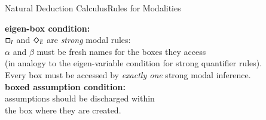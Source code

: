 \begin{frame}[shrink]{Natural Deduction Calculus}{Rules for Modalities}

\begin{unnamedCalculus}

\vspace{1em}

\s\s\s
{}
\s\s\s\s\s
{}

\vspace{2em}

\s\s\s
{}
\s\s\s\s\s
{}


\vspace{1em}

\begin{center}
\textbf{eigen-box condition:}\\ 
$\Box_I$ and $\Diamond_E$ are \emph{strong} modal rules: \\
$\alpha$ and $\beta$ must be fresh names for the boxes they access \\ 
(in analogy to the eigen-variable condition for strong quantifier rules). \\
Every box must be accessed by \emph{exactly one} strong modal inference. \\
\vspace{0.5em}
\textbf{boxed assumption condition:} \\
assumptions should be discharged within \\
the box where they are created.
\end{center}

\end{unnamedCalculus}

\end{frame}


